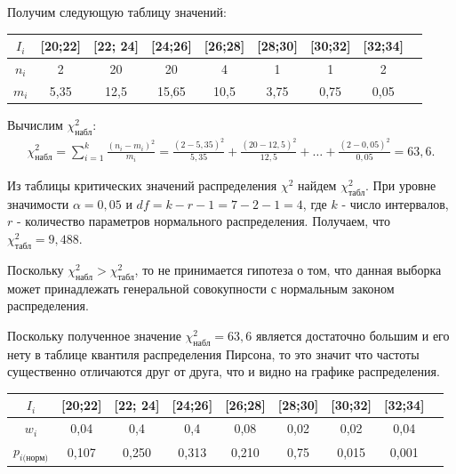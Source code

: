 \documentclass[utf8, a4paper, 14pt, russian, oneside]{book}
\begin{document}
Получим следующую таблицу значений:
\begin{table}[h!]
    \centering
    \begin{tabular}{|c|c|c|c|c|c|c|c|c|}
        \hline
        $I_i$  & [20;22] & [22; 24] & [24;26] & [26;28] & [28;30] & [30;32] & [32;34] \\
        \hline
        $n_i$ & 2 & 20 & 20 & 4 & 1 & 1 & 2 \\
        \hline
        $m_i$ & 5,35 & 12,5 & 15,65 & 10,5 & 3,75 & 0,75 & 0,05\\
        \hline
    \end{tabular}
\end{table}
\newpage

Вычислим $\chi^2_{\text{набл}}$:
\begin{align*}
    \chi^2_{\text{набл}} = \sum\limits_{i=1}^k \frac{(n_i - m_i)^2}{m_i} = \frac{(2 - 5,35)^2}{5,35} + \frac{(20 - 12,5)^2}{12,5} + \dots + \frac{(2 - 0,05)^2}{0,05} = 63,6.
\end{align*}

Из таблицы критических значений распределения $\chi^2$ найдем $\chi^2_{\text{табл}}$.
При уровне значимости $\alpha = 0,05$ и $df = k - r -1 = 7 - 2 - 1 = 4$,
где $k$ - число интервалов, $r$ - количество параметров нормального распределения. Получаем, что $\chi^2_{\text{табл}} = 9,488$.

Поскольку $\chi^2_{\text{набл}} > \chi^2_{\text{табл}}$, то не принимается гипотеза о том, что данная выборка может принадлежать генеральной совокупности
с нормальным законом распределения.


Поскольку полученное значение $\chi^2_{\text{набл}} = 63,6$ является достаточно большим и его нету в таблице квантиля распределения Пирсона, то
это значит что частоты существенно отличаются друг от друга, что и видно на графике распределения.


\begin{table}[h!]
    \centering
    \begin{tabular}{|c|c|c|c|c|c|c|c|c|}
        \hline
        $I_i$  & [20;22] & [22; 24] & [24;26] & [26;28] & [28;30] & [30;32] & [32;34] \\
        \hline
        $w_i$ & 0,04 & 0,4 & 0,4 & 0,08 & 0,02 & 0,02 & 0,04 \\
        \hline
        $p_{i\text{(норм)}}$ & 0,107 & 0,250 & 0,313 & 0,210 & 0,75 & 0,015 & 0,001 \\
        \hline
    \end{tabular}
\end{table}
\end{document}
